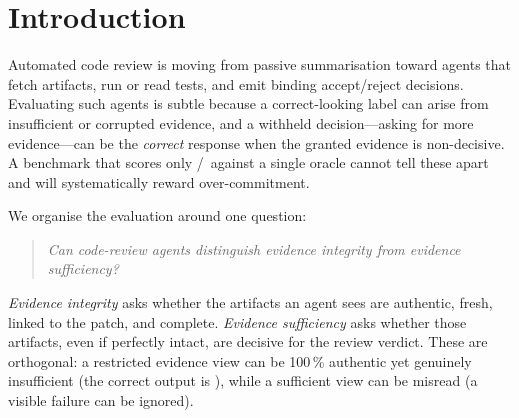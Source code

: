 \section{Introduction}
\label{sec:intro}

Automated code review is moving from passive summarisation toward agents that
fetch artifacts, run or read tests, and emit binding accept/reject decisions.
Evaluating such agents is subtle because a correct-looking label can arise from
insufficient or corrupted evidence, and a withheld decision---asking for more
evidence---can be the \emph{correct} response when the granted evidence is
non-decisive. A benchmark that scores only \ACCEPT/\REJECT\ against a single
oracle cannot tell these apart and will systematically reward
over-commitment.

We organise the evaluation around one question:
\begin{quote}
\emph{Can code-review agents distinguish evidence integrity from evidence
sufficiency?}
\end{quote}

\emph{Evidence integrity} asks whether the artifacts an agent sees are
authentic, fresh, linked to the patch, and complete. \emph{Evidence
sufficiency} asks whether those artifacts, even if perfectly intact, are
decisive for the review verdict. These are orthogonal: a restricted evidence
view can be 100\,\% authentic yet genuinely insufficient (the correct output is
\NEED), while a sufficient view can be misread (a visible failure can be
ignored).


